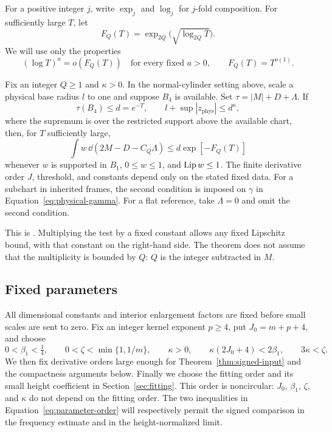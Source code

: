 For a positive integer $j$, write $\exp_j$ and $\log_j$ for $j$-fold
composition. For sufficiently large $T$, let
\begin{equation}\label{eq:signed-rate}
 F_Q(T)=\exp_{2Q}\bigl(\sqrt{\log_{2Q}T}\bigr).
\end{equation}
We will use only the properties
\[
 (\log T)^a=o(F_Q(T))\quad\text{for every fixed }a>0,
 \qquad F_Q(T)=T^{o(1)}.
\]

\begin{theorem}\label{thm:signed-input}
Fix an integer $Q\ge1$ and $\kappa>0$. In the normal-cylinder setting above, scale a
physical base radius $l$ to one and suppose $B_4$ is available. Set
$\tau=|M|+D+\Lambda$. If
\begin{equation}\label{eq:signed-hypotheses}
 \tau(B_4)\le d=e^{-T},\qquad
 l+\sup|z_{\mathrm{phys}}|\le d^\kappa,
\end{equation}
where the supremum is over the restricted support above the available
chart, then, for $T$ sufficiently large,
\begin{equation}\label{eq:signed-input}
 \int w\,\dd(2M-D-C_Q\Lambda)
       \le d\exp[-F_Q(T)]
\end{equation}
whenever $w$ is supported in $B_1$, $0\le w\le1$, and $\operatorname{Lip} w\le1$.
The finite derivative order $J$, threshold, and constants depend only
on the stated fixed data. For a subchart in inherited frames, the second
condition is imposed on $\gamma$ in Equation~\eqref{eq:physical-gamma}.
For a flat reference, take $\Lambda=0$ and omit the second condition.
\end{theorem}

This is \cite[Theorem~3.1]{AE}. Multiplying the test by a fixed constant
allows any fixed Lipschitz bound, with that constant on the right-hand
side. The theorem does not assume that the multiplicity is bounded by
$Q$: $Q$ is the integer subtracted in $M$.

\subsection{Fixed parameters}
All dimensional constants and interior enlargement factors are fixed
before small scales are sent to zero. Fix an integer kernel exponent $p\ge4$, put
$J_0=m+p+4$, and choose
\begin{equation}\label{eq:parameter-order}
 0<\beta_1<\tfrac14,\qquad
 0<\zeta<\min\{1,1/m\},\qquad \kappa>0,\qquad
 \kappa(2J_0+4)<2\beta_1,\qquad 3\kappa<\zeta.
\end{equation}
We then fix derivative orders large enough for Theorem~\ref{thm:signed-input}
and the compactness arguments below. Finally we choose the fitting order
and its small height coefficient in Section~\ref{sec:fitting}.
This order is noncircular: $J_0$, $\beta_1$, $\zeta$, and $\kappa$ do not
depend on the fitting order. The two inequalities in
Equation~\eqref{eq:parameter-order} will respectively permit the signed
comparison in the frequency estimate and in the height-normalized limit.
